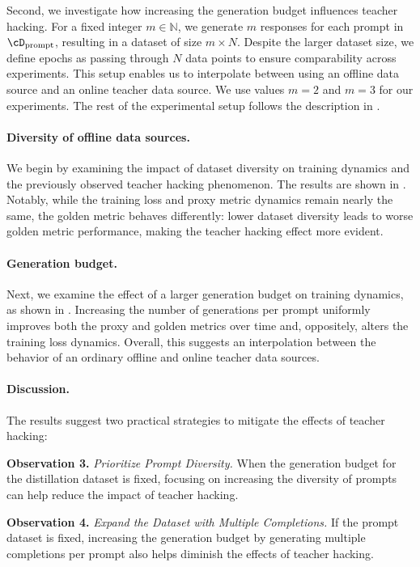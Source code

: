 Second, we investigate how increasing the generation budget influences teacher hacking. For a fixed integer $m \in \mathbb{N}$, we generate $m$ responses for each prompt in $\cD_{\mathrm{prompt}}$, resulting in a dataset of size $m \times N$. Despite the larger dataset size, we define epochs as passing through $N$ data points to ensure comparability across experiments. This setup enables us to interpolate between using an offline data source and an online teacher data source. We use values $m=2$ and $m=3$ for our experiments. The rest of the experimental setup follows the description in .


\paragraph{Diversity of offline data sources.}

We begin by examining the impact of dataset diversity on training dynamics and the previously observed teacher hacking phenomenon. The results are shown in . Notably, while the training loss and proxy metric dynamics remain nearly the same, the golden metric behaves differently: lower dataset diversity leads to worse golden metric performance, making the teacher hacking effect more evident.

\paragraph{Generation budget.}
Next, we examine the effect of a larger generation budget on training dynamics, as shown in . Increasing the number of generations per prompt uniformly improves both the proxy and golden metrics over time and, oppositely, alters the training loss dynamics. Overall, this suggests an interpolation between the behavior of an ordinary offline and online teacher data sources.

\paragraph{Discussion.}

The results suggest two practical strategies to mitigate the effects of teacher hacking:

\begin{tcolorbox}[colback=colorblue,
    colframe=black,
    arc=4pt,
    boxsep=0.3pt,
]%
\textbf{Observation 3.} \textit{Prioritize Prompt Diversity.} When the generation budget for the distillation dataset is fixed, focusing on increasing the diversity of prompts can help reduce the impact of teacher hacking.
\end{tcolorbox}

\begin{tcolorbox}[colback=colorblue,
    colframe=black,
    arc=4pt,
    boxsep=0.3pt,
]%
\textbf{Observation 4.} \textit{Expand the Dataset with Multiple Completions.} If the prompt dataset is fixed, increasing the generation budget by generating multiple completions per prompt also helps diminish the effects of teacher hacking.
\end{tcolorbox}
